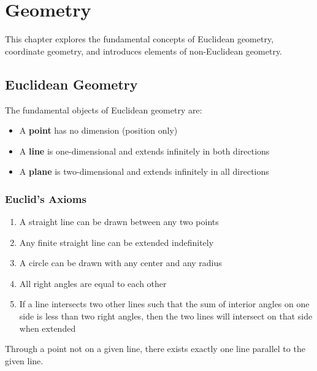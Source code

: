 \chapter{Geometry}

This chapter explores the fundamental concepts of Euclidean geometry, coordinate geometry, and introduces elements of non-Euclidean geometry.

\section{Euclidean Geometry}

\begin{definition}
The fundamental objects of Euclidean geometry are:
\begin{itemize}
    \item A \textbf{point} has no dimension (position only)
    \item A \textbf{line} is one-dimensional and extends infinitely in both directions
    \item A \textbf{plane} is two-dimensional and extends infinitely in all directions
\end{itemize}
\end{definition}

\subsection{Euclid's Axioms}

\begin{theorem}
\begin{enumerate}
    \item A straight line can be drawn between any two points
    \item Any finite straight line can be extended indefinitely
    \item A circle can be drawn with any center and any radius
    \item All right angles are equal to each other
    \item If a line intersects two other lines such that the sum of interior angles on one side is less than two right angles, then the two lines will intersect on that side when extended
\end{enumerate}
\end{theorem}

\begin{theorem}
Through a point not on a given line, there exists exactly one line parallel to the given line.
\end{theorem}


